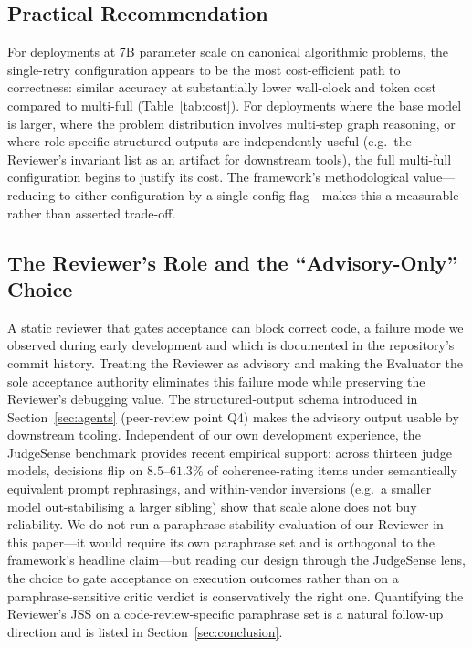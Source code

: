 \documentclass[journal]{IEEEtran}
\begin{document}
\subsection{Practical Recommendation}
For deployments at 7B parameter scale on canonical algorithmic problems, the single-retry configuration appears to be the most cost-efficient path to correctness: similar accuracy at substantially lower wall-clock and token cost compared to multi-full (Table~\ref{tab:cost}). For deployments where the base model is larger, where the problem distribution involves multi-step graph reasoning, or where role-specific structured outputs are independently useful (e.g.\ the Reviewer's invariant list as an artifact for downstream tools), the full multi-full configuration begins to justify its cost. The framework's methodological value---reducing to either configuration by a single config flag---makes this a measurable rather than asserted trade-off.

\subsection{The Reviewer's Role and the ``Advisory-Only'' Choice}
A static reviewer that gates acceptance can block correct code, a failure mode we observed during early development and which is documented in the repository's commit history. Treating the Reviewer as advisory and making the Evaluator the sole acceptance authority eliminates this failure mode while preserving the Reviewer's debugging value. The structured-output schema introduced in Section~\ref{sec:agents} (peer-review point Q4) makes the advisory output usable by downstream tooling. Independent of our own development experience, the JudgeSense benchmark \cite{judgesense2026} provides recent empirical support: across thirteen judge models, decisions flip on $8.5$--$61.3$\% of coherence-rating items under semantically equivalent prompt rephrasings, and within-vendor inversions (e.g.\ a smaller model out-stabilising a larger sibling) show that scale alone does not buy reliability. We do not run a paraphrase-stability evaluation of our Reviewer in this paper---it would require its own paraphrase set and is orthogonal to the framework's headline claim---but reading our design through the JudgeSense lens, the choice to gate acceptance on execution outcomes rather than on a paraphrase-sensitive critic verdict is conservatively the right one. Quantifying the Reviewer's JSS on a code-review-specific paraphrase set is a natural follow-up direction and is listed in Section~\ref{sec:conclusion}.
\end{document}
